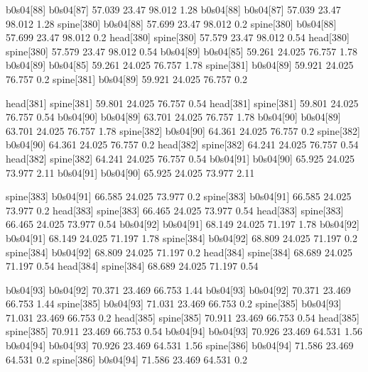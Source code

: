 b0s04[88]    b0s04[87]    57.039    23.47    98.012    1.28
b0s04[88]    b0s04[87]    57.039    23.47    98.012    1.28
spine[380]    b0s04[88]    57.699    23.47    98.012    0.2
spine[380]    b0s04[88]    57.699    23.47    98.012    0.2
head[380]    spine[380]    57.579    23.47    98.012    0.54
head[380]    spine[380]    57.579    23.47    98.012    0.54
b0s04[89]    b0s04[85]    59.261    24.025    76.757    1.78
b0s04[89]    b0s04[85]    59.261    24.025    76.757    1.78
spine[381]    b0s04[89]    59.921    24.025    76.757    0.2
spine[381]    b0s04[89]    59.921    24.025    76.757    0.2


head[381]    spine[381]    59.801    24.025    76.757    0.54
head[381]    spine[381]    59.801    24.025    76.757    0.54
b0s04[90]    b0s04[89]    63.701    24.025    76.757    1.78
b0s04[90]    b0s04[89]    63.701    24.025    76.757    1.78
spine[382]    b0s04[90]    64.361    24.025    76.757    0.2
spine[382]    b0s04[90]    64.361    24.025    76.757    0.2
head[382]    spine[382]    64.241    24.025    76.757    0.54
head[382]    spine[382]    64.241    24.025    76.757    0.54
b0s04[91]    b0s04[90]    65.925    24.025    73.977    2.11
b0s04[91]    b0s04[90]    65.925    24.025    73.977    2.11


spine[383]    b0s04[91]    66.585    24.025    73.977    0.2
spine[383]    b0s04[91]    66.585    24.025    73.977    0.2
head[383]    spine[383]    66.465    24.025    73.977    0.54
head[383]    spine[383]    66.465    24.025    73.977    0.54
b0s04[92]    b0s04[91]    68.149    24.025    71.197    1.78
b0s04[92]    b0s04[91]    68.149    24.025    71.197    1.78
spine[384]    b0s04[92]    68.809    24.025    71.197    0.2
spine[384]    b0s04[92]    68.809    24.025    71.197    0.2
head[384]    spine[384]    68.689    24.025    71.197    0.54
head[384]    spine[384]    68.689    24.025    71.197    0.54


b0s04[93]    b0s04[92]    70.371    23.469    66.753    1.44
b0s04[93]    b0s04[92]    70.371    23.469    66.753    1.44
spine[385]    b0s04[93]    71.031    23.469    66.753    0.2
spine[385]    b0s04[93]    71.031    23.469    66.753    0.2
head[385]    spine[385]    70.911    23.469    66.753    0.54
head[385]    spine[385]    70.911    23.469    66.753    0.54
b0s04[94]    b0s04[93]    70.926    23.469    64.531    1.56
b0s04[94]    b0s04[93]    70.926    23.469    64.531    1.56
spine[386]    b0s04[94]    71.586    23.469    64.531    0.2
spine[386]    b0s04[94]    71.586    23.469    64.531    0.2


